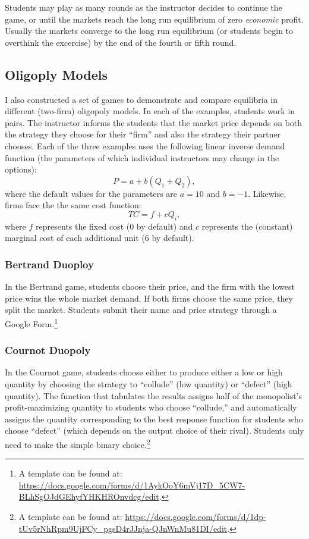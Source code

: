 \documentclass[
]{article}
\begin{document}
Students may play as many rounds as the instructor decides to continue
the game, or until the markets reach the long run equilibrium of zero
\emph{economic} profit. Usually the markets converge to the long run
equilibrium (or students begin to overthink the excercise) by the end of
the fourth or fifth round.

\hypertarget{oligoply-models}{%
\subsection{Oligoply Models}\label{oligoply-models}}

I also constructed a set of games to demonstrate and compare equilibria
in different (two-firm) oligopoly models. In each of the examples,
students work in pairs. The instructor informs the students that the
market price depends on both the strategy they choose for their ``firm''
and also the strategy their partner chooses. Each of the three examples
uses the following linear inverse demand function (the parameters of
which individual instructors may change in the options):
\[P = a + b(Q_1 + Q_2),\] where the default values for the parameters
are \(a = 10\) and \(b = -1\). Likewise, firms face the the same cost
function: \[TC = f + cQ_i,\] where \(f\) represents the fixed cost (0 by
default) and \(c\) represents the (constant) marginal cost of each
additional unit (6 by default).

\hypertarget{bertrand-duoploy}{%
\subsubsection{Bertrand Duoploy}\label{bertrand-duoploy}}

In the Bertrand game, students choose their price, and the firm with the
lowest price wins the whole market demand. If both firms choose the same
price, they split the market. Students submit their name and price
strategy through a Google Form.\footnote{A template can be found at:
  \url{https://docs.google.com/forms/d/1AykOoY6mVj17D_5CW7-BLhSgOJdGEhyfYHKHROnvdcg/edit}.}

\hypertarget{cournot-duopoly}{%
\subsubsection{Cournot Duopoly}\label{cournot-duopoly}}

In the Cournot game, students choose either to produce either a low or
high quantity by choosing the strategy to ``collude'' (low quantity) or
``defect'' (high quantity). The function that tabulates the results
assigns half of the monopolist's profit-maximizing quantity to students
who choose ``collude,'' and automatically assigns the quantity
corresponding to the best response function for students who choose
``defect'' (which depends on the output choice of their rival). Students
only need to make the simple binary choice.\footnote{A template can be
  found at:
  \url{https://docs.google.com/forms/d/1dp-tUv5rNhRpm9UjFCy_pgsD4rJJnja-QJnWnMu81DI/edit}.}
\end{document}
